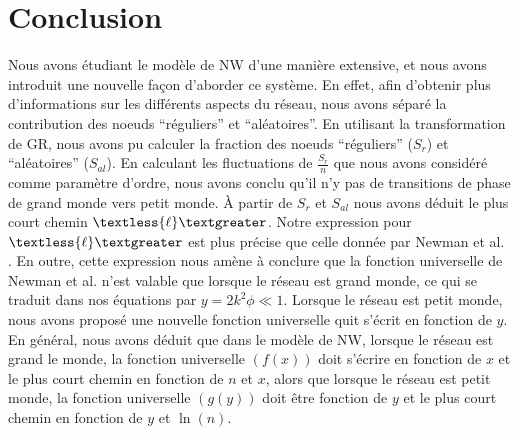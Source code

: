 \section{Conclusion}
Nous avons étudiant le modèle de NW d'une manière extensive, et nous avons introduit une nouvelle façon d'aborder ce système. En effet, afin d'obtenir plus d'informations sur les différents aspects du réseau, nous avons séparé la contribution des noeuds ``réguliers'' et ``aléatoires''. 
En utilisant la transformation de GR, nous avons pu calculer la fraction des noeuds ``réguliers''  ($S_r$) et ``aléatoires'' ($S_{al}$). En calculant les fluctuations de $\frac {S_r}{n}$ que nous avons considéré comme paramètre d'ordre, nous avons conclu qu'il n'y pas de transitions de phase de grand monde vers petit monde. \`{A} partir  de $S_r$ et $S_{al}$ nous avons déduit le plus court chemin $\textless {\ell} \textgreater$. Notre expression pour $\textless {\ell} \textgreater$ est plus précise que celle donnée par Newman et al. \cite{Newman-al2000}. En outre, cette expression nous amène à conclure que la fonction universelle de Newman et al. \cite{Newman-Watts1999-2} n'est valable que lorsque le réseau est grand monde, ce qui se traduit dans nos équations par $y=2k^2\phi \ll 1$. Lorsque le réseau est petit monde, nous avons proposé une nouvelle fonction universelle quit s'écrit en fonction de $y$.  En général, nous avons déduit que dans le modèle de NW, lorsque le réseau est grand le monde, la fonction universelle $(f(x))$ doit s'écrire en fonction de $x$ et le plus court chemin en fonction de $n$ et $x$, alors que lorsque le réseau est petit monde, la fonction universelle $(g(y))$ doit être fonction de $y$ et le plus court chemin en fonction de $y$ et $\ln(n)$.

